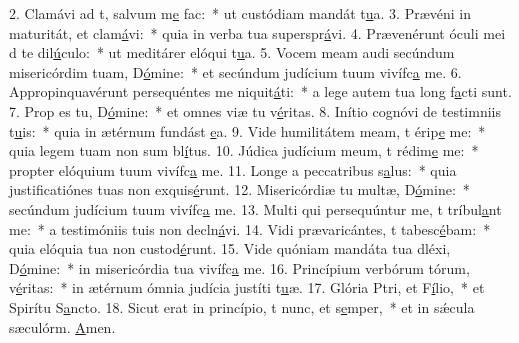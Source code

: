 2. Clamávi ad t, salvum m\uline{e} fac:~* ut custódiam mandát t\uline{u}a.
3. Prævéni in maturitát, et clam\uline{á}vi:~* quia in verba tua superspr\uline{á}vi.
4. Prævenérunt óculi mei d te dil\uline{ú}culo:~* ut meditárer elóqui t\uline{u}a.
5. Vocem meam audi secúndum misericórdim tuam, D\uline{ó}mine:~* et secúndum judícium tuum vivífc\uline{a} me.
6. Appropinquavérunt persequéntes me niquit\uline{á}ti:~* a lege autem tua long f\uline{a}cti sunt.
7. Prop es tu, D\uline{ó}mine:~* et omnes viæ tu v\uline{é}ritas.
8. Inítio cognóvi de testimniis t\uline{u}is:~* quia in ætérnum fundást \uline{e}a.
9. Vide humilitátem meam, t érip\uline{e} me:~* quia legem tuam non sum bl\uline{í}tus.
10. Júdica judícium meum, t rédim\uline{e} me:~* propter elóquium tuum vivífc\uline{a} me.
11. Longe a peccatribus s\uline{a}lus:~* quia justificatiónes tuas non exquis\uline{é}runt.
12. Misericórdiæ tu multæ, D\uline{ó}mine:~* secúndum judícium tuum vivífc\uline{a} me.
13. Multi qui persequúntur me, t tríbul\uline{a}nt me:~* a testimóniis tuis non decln\uline{á}vi.
14. Vidi prævaricántes, t tabesc\uline{é}bam:~* quia elóquia tua non custod\uline{é}runt.
15. Vide quóniam mandáta tua dléxi, D\uline{ó}mine:~* in misericórdia tua vivífc\uline{a} me.
16. Princípium verbórum tórum, v\uline{é}ritas:~* in ætérnum ómnia judícia justíti t\uline{u}æ.
17. Glória Ptri, et F\uline{í}lio,~* et Spirítu S\uline{a}ncto.
18. Sicut erat in princípio, t nunc, et s\uline{e}mper,~* et in sǽcula sæculórm. \uline{A}men.
